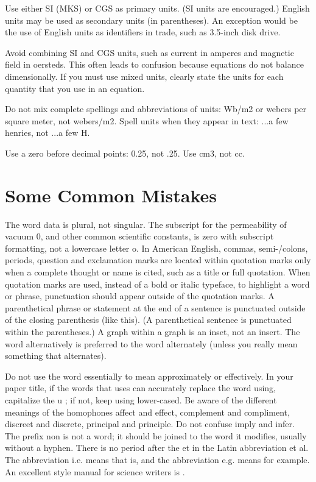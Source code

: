 \documentclass{article}
\begin{document}
Use either SI (MKS) or CGS as primary units. (SI units are encouraged.) English units may be used as secondary units (in parentheses). An exception would be the use of English units as identifiers in trade, such as  3.5-inch disk drive. 

Avoid combining SI and CGS units, such as current in amperes and magnetic field in oersteds. This often leads to confusion because equations do not balance dimensionally. If you must use mixed units, clearly state the units for each quantity that you use in an equation.

Do not mix complete spellings and abbreviations of units:  Wb/m2  or  webers per square meter,  not  webers/m2.  Spell units when they appear in text:  ...a few henries,  not  ...a few H.

Use a zero before decimal points:  0.25,  not  .25.  Use  cm3,  not  cc. 


\vspace{7pt}
\section{Some Common Mistakes}
The word  data  is plural, not singular.
The subscript for the permeability of vacuum  0, and other common scientific constants, is zero with subscript formatting, not a lowercase letter  o. 
In American English, commas, semi-/colons, periods, question and exclamation marks are located within quotation marks only when a complete thought or name is cited, such as a title or full quotation. When quotation marks are used, instead of a bold or italic typeface, to highlight a word or phrase, punctuation should appear outside of the quotation marks. A parenthetical phrase or statement at the end of a sentence is punctuated outside of the closing parenthesis (like this). (A parenthetical sentence is punctuated within the parentheses.)
A graph within a graph is an  inset,  not an  insert.  The word alternatively is preferred to the word  alternately  (unless you really mean something that alternates).

Do not use the word  essentially  to mean  approximately  or  effectively. 
In your paper title, if the words  that uses  can accurately replace the word using, capitalize the  u ; if not, keep using lower-cased.
Be aware of the different meanings of the homophones  affect  and  effect,   complement  and  compliment,   discreet  and  discrete,   principal  and  principle. 
Do not confuse  imply  and  infer. 
The prefix  non  is not a word; it should be joined to the word it modifies, usually without a hyphen.
There is no period after the  et  in the Latin abbreviation  et al. 
The abbreviation  i.e.  means  that is,  and the abbreviation  e.g.  means  for example. 
An excellent style manual for science writers is \cite{Young}.
\end{document}
